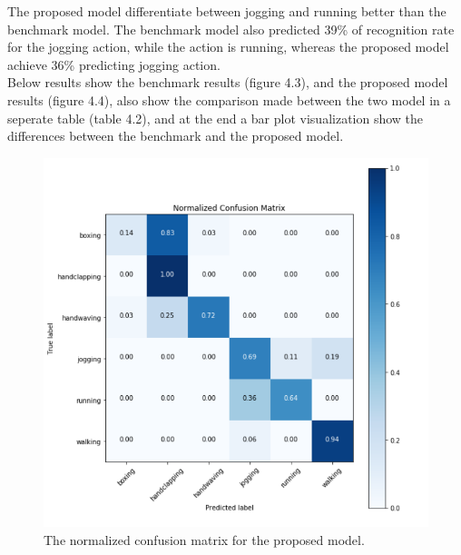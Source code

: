     The proposed model differentiate between jogging and running better than the benchmark model. The benchmark model also predicted 39\% of recognition rate for the jogging action, while the action is running, whereas the proposed model achieve 36\% predicting jogging action.\\
    
    Below results show the benchmark results (figure 4.3), and the proposed model results (figure 4.4), also show the comparison made between the two model in a seperate table (table 4.2), and at the end a bar plot visualization show the differences between the benchmark and the proposed model.\\
    
    
    \begin{figure}[ht]
    \centering
    \includegraphics{Figures/bench1}
    \decoRule
    \caption [The normalized confusion matrix for the proposed model.]{The normalized confusion matrix for the proposed model.}
    \label{fig:la}
    \end{figure}
    \newpage
    
